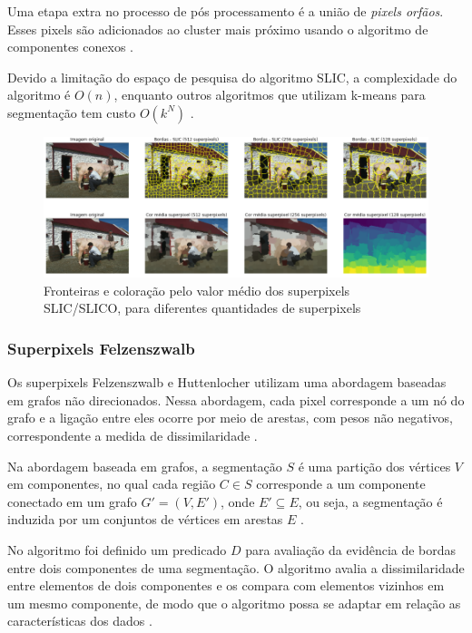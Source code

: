 \begin{document}
Uma etapa extra no processo de pós processamento é a união de \textit{pixels orfãos}. Esses pixels são adicionados ao cluster mais próximo usando o algoritmo de componentes conexos \cite{SLIC}.

Devido a limitação do espaço de pesquisa do algoritmo SLIC, a complexidade do algoritmo é $O(n)$, enquanto outros algoritmos que utilizam k-means para segmentação tem custo $O(k^N)$ \cite{SLIC}.

\begin{figure}[ht]
\centering
\includegraphics[width=1.\textwidth]{slic_segmentation_compare.png}
\caption{Fronteiras e coloração pelo valor médio dos superpixels SLIC/SLICO, para diferentes quantidades de superpixels}
\label{alg:SLIC}
\end{figure}


\subsubsection{Superpixels Felzenszwalb} \label{sssec:slic}

Os superpixels Felzenszwalb e Huttenlocher utilizam uma abordagem baseadas em grafos não direcionados. Nessa abordagem, cada pixel corresponde a um nó do grafo e a ligação entre eles ocorre por meio de arestas, com pesos não negativos, correspondente a medida de dissimilaridade \cite{FELZENSZWALB}. 

Na abordagem baseada em grafos, a segmentação $S$ é uma partição dos vértices $V$ em componentes, no qual cada região $C \in S$ corresponde a um componente conectado em um grafo $G'=(V,E')$, onde $E' \subseteq E$, ou seja, a segmentação é induzida por um conjuntos de vértices em arestas $E$ \cite{FELZENSZWALB}.

No algoritmo foi definido um predicado $D$ para avaliação da evidência de bordas entre dois componentes de uma segmentação. O algoritmo avalia a dissimilaridade entre elementos de dois componentes e os compara com elementos vizinhos em um mesmo componente, de modo que o algoritmo possa se adaptar em relação as características dos dados \cite{FELZENSZWALB}. 
\end{document}
